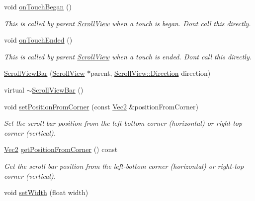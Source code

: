 \begin{DoxyCompactItemize}
void \hyperlink{classui_1_1ScrollViewBar_a140a5400e240869c9295eec8ddf7823b}{on\+Touch\+Began} ()
\begin{DoxyCompactList}\small\item\em This is called by parent \hyperlink{classui_1_1ScrollView}{Scroll\+View} when a touch is began. Don\textquotesingle{}t call this directly. \end{DoxyCompactList}\item 
\mbox{\label{classui_1_1ScrollViewBar_a3aa656e9573c1995851bfe2f1a91eac8}} 
void \hyperlink{classui_1_1ScrollViewBar_a3aa656e9573c1995851bfe2f1a91eac8}{on\+Touch\+Ended} ()
\begin{DoxyCompactList}\small\item\em This is called by parent \hyperlink{classui_1_1ScrollView}{Scroll\+View} when a touch is ended. Don\textquotesingle{}t call this directly. \end{DoxyCompactList}\item 
\hyperlink{classui_1_1ScrollViewBar_a3fe40127ee557a66d7dfa2eb41d9219b}{Scroll\+View\+Bar} (\hyperlink{classui_1_1ScrollView}{Scroll\+View} $\ast$parent, \hyperlink{classui_1_1ScrollView_aed2d778ae8098dcafe323b2beae8dd6b}{Scroll\+View\+::\+Direction} direction)
\item 
virtual \hyperlink{classui_1_1ScrollViewBar_a8b9693b08819e21ac42d28613b9fc75f}{$\sim$\+Scroll\+View\+Bar} ()
\item 
void \hyperlink{classui_1_1ScrollViewBar_a89cb4e9250dbc32036e970c18b2c8c08}{set\+Position\+From\+Corner} (const \hyperlink{classVec2}{Vec2} \&position\+From\+Corner)
\begin{DoxyCompactList}\small\item\em Set the scroll bar position from the left-\/bottom corner (horizontal) or right-\/top corner (vertical). \end{DoxyCompactList}\item 
\hyperlink{classVec2}{Vec2} \hyperlink{classui_1_1ScrollViewBar_a4f78c98f3dc3b7d612796d26a2f9416d}{get\+Position\+From\+Corner} () const
\begin{DoxyCompactList}\small\item\em Get the scroll bar position from the left-\/bottom corner (horizontal) or right-\/top corner (vertical). \end{DoxyCompactList}\item 
void \hyperlink{classui_1_1ScrollViewBar_aad9c46e5d319dcc2737af241753fc0b0}{set\+Width} (float width)

\end{DoxyCompactItemize}
